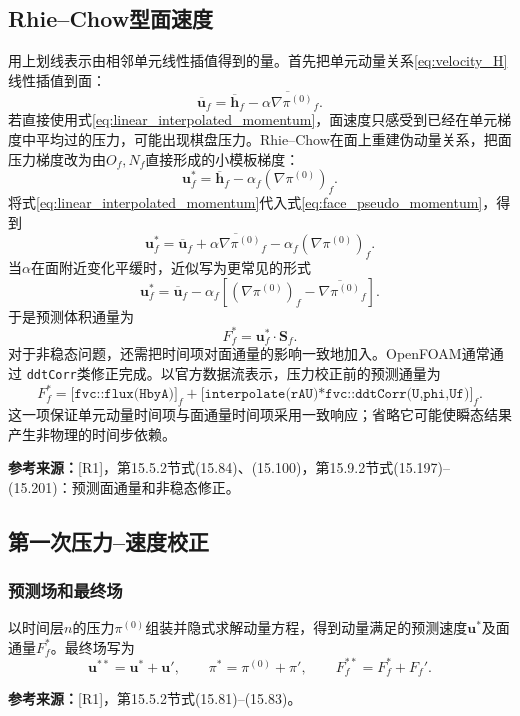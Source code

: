 \documentclass[UTF8,12pt,a4paper]{ctexart}
\numberwithin{equation}{section}
\newcommand{\Rone}{\textnormal{[R1]}}
\newcommand{\source}[1]{\par\smallskip\noindent\colorbox{sourcebg}{%
  \parbox{0.955\linewidth}{\footnotesize\color{sourcegray}\textbf{参考来源：}#1}}\par\smallskip}
\begin{document}
\subsection{Rhie--Chow型面速度}
用上划线表示由相邻单元线性插值得到的量。首先把单元动量关系\eqref{eq:velocity_H}线性插值到面：
\begin{equation}
  \overline{\bm u}_f
  =\overline{\bm h}_f
  -\overline{\alpha\nabla\pi^{(0)}}_f.
  \label{eq:linear_interpolated_momentum}
\end{equation}
若直接使用式\eqref{eq:linear_interpolated_momentum}，面速度只感受到已经在单元梯度中平均过的压力，可能出现棋盘压力。Rhie--Chow在面上重建伪动量关系，把面压力梯度改为由$O_f,N_f$直接形成的小模板梯度：
\begin{equation}
  \bm u_f^*=\overline{\bm h}_f
  -\alpha_f(\nabla\pi^{(0)})_f.
  \label{eq:face_pseudo_momentum}
\end{equation}
将式\eqref{eq:linear_interpolated_momentum}代入式\eqref{eq:face_pseudo_momentum}，得到
\begin{equation}
  \boxed{\bm u_f^*
  =\overline{\bm u}_f
  +\overline{\alpha\nabla\pi^{(0)}}_f
  -\alpha_f(\nabla\pi^{(0)})_f.}
  \label{eq:rhie_chow}
\end{equation}
当$\alpha$在面附近变化平缓时，近似写为更常见的形式
\[
  \bm u_f^*=\overline{\bm u}_f
  -\alpha_f\left[(\nabla\pi^{(0)})_f
  -\overline{\nabla\pi^{(0)}}_f\right].
\]
于是预测体积通量为
\begin{equation}
  \boxed{F_f^*=\bm u_f^*\cdot\bm S_f.}
  \label{eq:predicted_flux}
\end{equation}
对于非稳态问题，还需把时间项对面通量的影响一致地加入。OpenFOAM通常通过
\texttt{ddtCorr}类修正完成。以官方数据流表示，压力校正前的预测通量为
\begin{equation}
  \boxed{F_f^*=
  \bigl[\texttt{fvc::flux(HbyA)}\bigr]_f
  +
  \bigl[\texttt{interpolate(rAU)*fvc::ddtCorr(U,phi,Uf)}\bigr]_f.}
  \label{eq:transient_rhie_chow_flux}
\end{equation}
这一项保证单元动量时间项与面通量时间项采用一致响应；省略它可能使瞬态结果产生非物理的时间步依赖。
\source{\Rone，第15.5.2节式(15.84)、(15.100)，第15.9.2节式(15.197)--(15.201)：预测面通量和非稳态修正。}

\subsection{第一次压力--速度校正}
\subsubsection{预测场和最终场}
以时间层$n$的压力$\pi^{(0)}$组装并隐式求解动量方程，得到动量满足的预测速度$\bm u^*$及面通量$F_f^*$。最终场写为
\begin{equation}
  \bm u^{**}=\bm u^*+\bm u',\qquad
  \pi^*=\pi^{(0)}+\pi',\qquad
  F_f^{**}=F_f^*+F_f'.
  \label{eq:first_corrections}
\end{equation}
\source{\Rone，第15.5.2节式(15.81)--(15.83)。}
\end{document}
